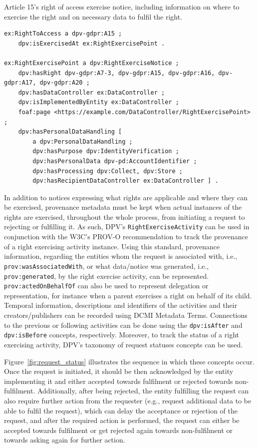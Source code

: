 \begin{listing}[htp]
\caption{Article 15's right of access exercise notice, including information on where to exercise the right and on necessary data to fulfil the right.}
\label{list:exercise_point}
\begin{verbatim}
ex:RightToAccess a dpv-gdpr:A15 ;
    dpv:isExercisedAt ex:RightExercisePoint .

ex:RightExercisePoint a dpv:RightExerciseNotice ;
    dpv:hasRight dpv-gdpr:A7-3, dpv-gdpr:A15, dpv-gdpr:A16, dpv-gdpr:A17, dpv-gdpr:A20 ;
    dpv:hasDataController ex:DataController ;
    dpv:isImplementedByEntity ex:DataController ;
    foaf:page <https://example.com/DataController/RightExercisePoint> ;
    dpv:hasPersonalDataHandling [ 
        a dpv:PersonalDataHandling ;
        dpv:hasPurpose dpv:IdentityVerification ;
        dpv:hasPersonalData dpv-pd:AccountIdentifier ;
        dpv:hasProcessing dpv:Collect, dpv:Store ;
        dpv:hasRecipientDataController ex:DataController ] .
\end{verbatim}
\end{listing}

In addition to notices expressing what rights are applicable and where they can be exercised, provenance metadata must be kept when actual instances of the rights are exercised, throughout the whole process, from initiating a request to rejecting or fulfilling it.
As such, DPV's \texttt{RightExerciseActivity} can be used in conjunction with the W3C's PROV-O recommendation \citep{lebo_prov-o_2013} to track the provenance of a right exercising activity instance.
Using this standard, provenance information, regarding the entities whom the request is associated with, i.e., \texttt{prov:wasAssociatedWith}, or what data/notice was generated, i.e., \texttt{prov:generated}, by the right exercise activity, can be represented.
\texttt{prov:actedOnBehalfOf} can also be used to represent delegation or representation, for instance when a parent exercises a right on behalf of its child.
Temporal information, descriptions and identifiers of the activities and their creators/publishers can be recorded using DCMI Metadata Terms.
Connections to the previous or following activities can be done using the \texttt{dpv:isAfter} and \texttt{dpv:isBefore} concepts, respectively.
Moreover, to track the status of a right exercising activity, DPV's taxonomy of request statuses concepts can be used.

Figure~\ref{fig:request_status} illustrates the sequence in which these concepts occur.
Once the request is initiated, it should be then acknowledged by the entity implementing it and either accepted towards fulfilment or rejected towards non-fulfilment.
Additionally, after being rejected, the entity fulfilling the request can also require further action from the requester (e.g., request additional data to be able to fulfil the request), which can delay the acceptance or rejection of the request, and after the required action is performed, the request can either be accepted towards fulfilment or get rejected again towards non-fulfilment or towards asking again for further action.

